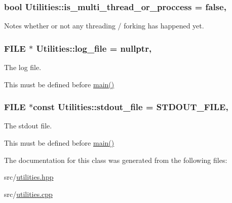 \subsubsection[{\texorpdfstring{is\+\_\+multi\+\_\+thread\+\_\+or\+\_\+proccess}{is_multi_thread_or_proccess}}]{\setlength{\rightskip}{0pt plus 5cm}bool Utilities\+::is\+\_\+multi\+\_\+thread\+\_\+or\+\_\+proccess = false\hspace{0.3cm}{\ttfamily [static]}, {\ttfamily [private]}}\hypertarget{class_utilities_af893d8dcd5bb1ba3fc72fc108536bcbc}{}\label{class_utilities_af893d8dcd5bb1ba3fc72fc108536bcbc}


Notes whether or not any threading / forking has happened yet. 

\subsubsection[{\texorpdfstring{log\+\_\+file}{log_file}}]{\setlength{\rightskip}{0pt plus 5cm}F\+I\+LE $\ast$ Utilities\+::log\+\_\+file = nullptr\hspace{0.3cm}{\ttfamily [static]}, {\ttfamily [private]}}\hypertarget{class_utilities_a63ce9d08b6459cd102bb368a274aca07}{}\label{class_utilities_a63ce9d08b6459cd102bb368a274aca07}


The log file. 

This must be defined before \hyperlink{shadow__stack_8cpp_a0ddf1224851353fc92bfbff6f499fa97}{main()} 
\subsubsection[{\texorpdfstring{stdout\+\_\+file}{stdout_file}}]{\setlength{\rightskip}{0pt plus 5cm}F\+I\+LE $\ast$const Utilities\+::stdout\+\_\+file = {\bf S\+T\+D\+O\+U\+T\+\_\+\+F\+I\+LE}\hspace{0.3cm}{\ttfamily [static]}, {\ttfamily [private]}}\hypertarget{class_utilities_a224eea0a234ac9877a8334f74fc89ef0}{}\label{class_utilities_a224eea0a234ac9877a8334f74fc89ef0}


The stdout file. 

This must be defined before \hyperlink{shadow__stack_8cpp_a0ddf1224851353fc92bfbff6f499fa97}{main()} 

The documentation for this class was generated from the following files\+:\begin{DoxyCompactItemize}
\item 
src/\hyperlink{utilities_8hpp}{utilities.\+hpp}\item 
src/\hyperlink{utilities_8cpp}{utilities.\+cpp}\end{DoxyCompactItemize}
